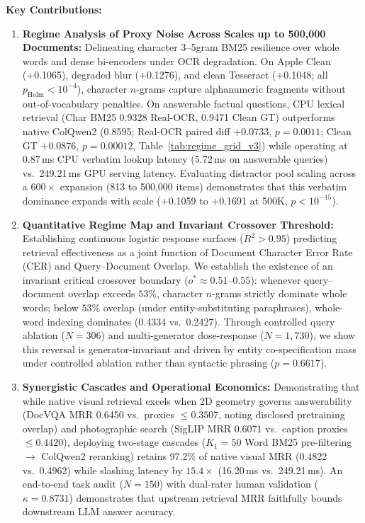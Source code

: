 \textbf{Key Contributions:}
\begin{enumerate}
    \setlength{\itemsep}{0.2pt plus 0.1pt}
    \setlength{\parskip}{0pt}
    \item \textbf{Regime Analysis of Proxy Noise Across Scales up to 500,000 Documents:} Delineating character 3--5gram BM25 resilience over whole words and dense bi-encoders under OCR degradation. On Apple Clean (+0.1065), degraded blur (+0.1276), and clean Tesseract (+0.1048; all $p_{\text{Holm}} < 10^{-4}$), character $n$-grams capture alphanumeric fragments without out-of-vocabulary penalties. On answerable factual questions, CPU lexical retrieval (Char BM25 0.9328 Real-OCR, 0.9471 Clean GT) outperforms native ColQwen2 (0.8595; Real-OCR paired diff $+0.0733$, $p = 0.0011$; Clean GT $+0.0876$, $p = 0.00012$, Table~\ref{tab:regime_grid_v3}) while operating at 0.87\,ms CPU verbatim lookup latency (5.72\,ms on answerable queries) vs.\ 249.21\,ms GPU serving latency. Evaluating distractor pool scaling across a $600\times$ expansion (813 to 500,000 items) demonstrates that this verbatim dominance expands with scale (+0.1059 to +0.1691 at 500K, $p < 10^{-15}$).
    \item \textbf{Quantitative Regime Map and Invariant Crossover Threshold:} Establishing continuous logistic response surfaces ($R^2 > 0.95$) predicting retrieval effectiveness as a joint function of Document Character Error Rate (CER) and Query--Document Overlap. We establish the existence of an invariant critical crossover boundary ($o^* \approx 0.51$--$0.55$): whenever query--document overlap exceeds $53\%$, character $n$-grams strictly dominate whole words; below $53\%$ overlap (under entity-substituting paraphrases), whole-word indexing dominates (0.4334 vs.\ 0.2427). Through controlled query ablation ($N=306$) and multi-generator dose-response ($N=1{,}730$), we show this reversal is generator-invariant and driven by entity co-specification mass under controlled ablation rather than syntactic phrasing ($p = 0.6617$).
    \item \textbf{Synergistic Cascades and Operational Economics:} Demonstrating that while native visual retrieval excels when 2D geometry governs answerability (DocVQA MRR 0.6450 vs.\ proxies $\le 0.3507$, noting disclosed pretraining overlap) and photographic search (SigLIP MRR 0.6071 vs.\ caption proxies $\le 0.4420$), deploying two-stage cascades ($K_1=50$ Word BM25 pre-filtering $\to$ ColQwen2 reranking) retains 97.2\% of native visual MRR (0.4822 vs.\ 0.4962) while slashing latency by $15.4\times$ (16.20\,ms vs.\ 249.21\,ms). An end-to-end task audit ($N=150$) with dual-rater human validation ($\kappa = 0.8731$) demonstrates that upstream retrieval MRR faithfully bounds downstream LLM answer accuracy.
\end{enumerate}

